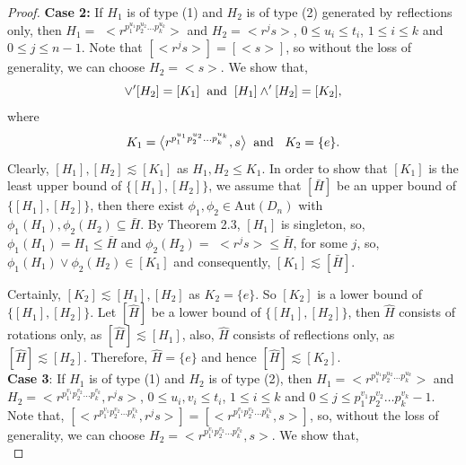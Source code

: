 \documentclass{article}
\theoremstyle{definition}
\begin{document}
\begin{proof}
\textbf{Case 2:} If $H_1$ is of type (1) and $H_2$ is of type (2) generated by reflections only, then $H_1=$ $\bigl<r^{p_1^{u_1}p_2^{u_2}\dots p_k^{u_k}}\bigr>$ and $H_2=\bigl<r^js\bigr>$, $0\le u_i\le t_i$, $1\le i\le k$ and $0\le j \le n-1$. Note that $[\bigl<r^js\bigr>]=[\bigl<s\bigr>]$, so without the loss of generality, we can choose $H_2=\bigl<s\bigr>$. We show that,
\begin{equation*}
    [H_1]\vee' [H_2]=[K_1] \hspace{0.2cm} \text{and} \hspace{0.2cm} [H_1]\wedge' [H_2]=[K_2],
\end{equation*}
where  
\begin{equation*}
 K_1=   \bigl<r^{p_1^{u_1}p_2^{u_2}\dots p_k^{u_k}},s\bigr> \hspace{0.2cm} \text{and }\hspace{0.2cm} K_2=\{e\}. 
\end{equation*}
Clearly, $[H_1],[H_2]\lesssim [K_1]$ as $H_1,H_2\le K_1$. In order to show that $[K_1]$ is the least upper bound of $\{[H_1],[H_2]\}$, we assume that $[\bar H]$ be an upper bound of $\{[H_1],[H_2]\}$, then there exist $\phi_1,\phi_2 \in \text{Aut}(D_n)$ with $\phi_1(H_1), \phi_2(H_2)\subseteq \bar H$. By Theorem 2.3, $[H_1]$ is singleton, so, $\phi_1(H_1)=H_1\le \bar H$ and $\phi_2(H_2)=$ $ \bigl<r^js\bigr>\le \bar H$, for some $j$, so, $\phi_1(H_1)\vee \phi_2(H_2)\in [K_1]$ and consequently, $[K_1]\lesssim [\bar H]$. \par
Certainly, $[K_2]\lesssim [H_1], [H_2]$ as $K_2=\{e\}$. So $[K_2]$ is a lower bound of $\{[H_1],[H_2]\}$. Let $[\widehat H]$ be a lower bound of $\{[H_1],[H_2]\}$, then $\widehat H$ consists of rotations only, as $[\widehat H]\lesssim [H_1]$, also, $\widehat H$ consists of reflections only, as $[\widehat H]\lesssim [H_2]$. Therefore, $\widehat H=\{e\}$ and hence $[\widehat H]\lesssim [K_2]$. \vspace{0.2cm}\\
\textbf{Case 3}: If $H_1$ is of type (1) and $H_2$ is of type (2), then $H_1=\bigl<r^{p_1^{u_1}p_2^{u_2}\dots p_k^{u_k}}\bigr>$ and $H_2=$$ \bigl<r^{p_1^{v_1}p_2^{v_2}\dots p_k^{v_k}},r^js\bigr>$, $0\le u_i,v_i\le t_i$, $1\le i\le k$ and $0\le j\le p_1^{v_1}p_2^{v_2}\dots p_k^{v_k}-1$. Note that, $ [\bigl<r^{p_1^{v_1}p_2^{v_2}\dots p_k^{v_k}},r^js\bigr>]=[\bigl<r^{p_1^{v_1}p_2^{v_2}\dots p_k^{v_k}},s\bigr>]$, so, without the loss of generality, we can choose $H_2=\bigl<r^{p_1^{v_1}p_2^{v_2}\dots p_k^{v_k}},s\bigr>$. We show that,
\begin{equation*}

\end{equation*}$$
\end{proof}
\end{document}
